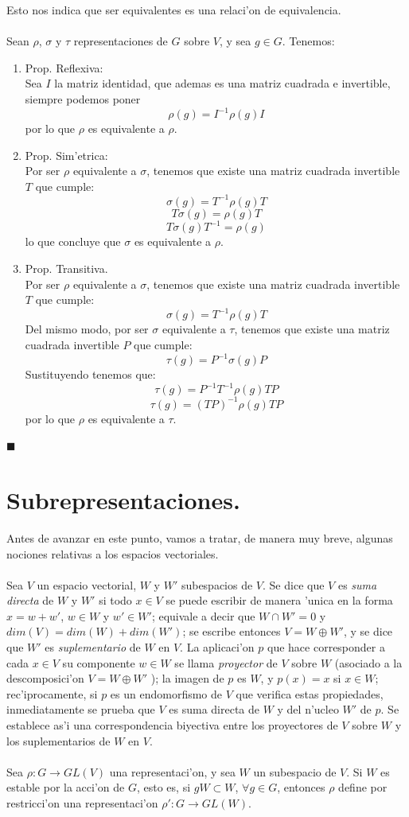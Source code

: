 \documentclass[a4paper,openright,12pt]{report}
\numberwithin{equation}{section} %
\newenvironment{proof}{\noindent{\it Demostracion:}}{\hfill$\blacksquare$} %
\begin{document}
Esto nos indica que ser equivalentes es una relaci'on de equivalencia.\\
\\
\begin{proof}
Sean $\rho$, $\sigma$ y $\tau$ representaciones de $G$ sobre $V$, y sea $g \in G$. Tenemos:
\begin{enumerate}
\item Prop. Reflexiva:\\
Sea $I$ la matriz identidad, que ademas es una matriz cuadrada e invertible, siempre podemos poner
\[
\rho (g) = I^{-1} \rho (g) I
\]
por lo que $\rho$ es equivalente a $\rho$.
\item Prop. Sim'etrica:\\
Por ser $\rho$ equivalente a $\sigma$, tenemos que existe una matriz cuadrada invertible $T$ que cumple:
\[
\sigma (g) = T^{-1}\rho (g) T
\]
\[
T \sigma (g) = \rho (g) T
\]
\[
T \sigma (g)T^{-1} = \rho (g) 
\]
lo que concluye que $\sigma$ es equivalente a $\rho$.
\item Prop. Transitiva.\\
Por ser $\rho$ equivalente a $\sigma$, tenemos que existe una matriz cuadrada invertible $T$ que cumple:
\[
\sigma (g) = T^{-1}\rho (g) T
\]
Del mismo modo, por ser $\sigma$ equivalente a $\tau$, tenemos que existe una matriz cuadrada invertible $P$ que cumple:
\[
\tau (g) = P^{-1}\sigma (g) P
\]
Sustituyendo tenemos que:
\[
\tau (g) = P^{-1}T^{-1} \rho (g)T P
\]
\[
\tau (g) = (TP)^{-1} \rho (g)T P
\]
por lo que $\rho$ es equivalente a $\tau$.
\end{enumerate}
\end{proof}
\section{Subrepresentaciones.}
Antes de avanzar en este punto, vamos a tratar, de manera muy breve, algunas nociones relativas a los espacios vectoriales.\\
\\
Sea $V$ un espacio vectorial, $W$ y $W'$ subespacios de $V$. Se dice que $V$ es \textit{suma directa} de $W$ y $W'$ si todo $x \in V$ se puede escribir de manera 'unica en la forma $x=w+w'$, $w \in W$ y $w' \in W'$; equivale a decir que $W \cap W'=0$ y $dim(V)=dim(W)+dim(W')$; se escribe entonces $V=W \oplus W'$, y se dice que $W'$ es \textit{suplementario} de $W$ en $V$. La aplicaci'on $p$ que hace corresponder a cada $x \in V$ su componente $w \in W$ se llama \textit{proyector} de $V$ sobre $W$ (asociado a la descomposici'on $V=W \oplus W'$ ); la imagen de $p$ es $W$, y $p(x)=x$ si $x \in W$; rec'iprocamente, si $p$ es un endomorfismo de $V$ que verifica estas propiedades, inmediatamente se prueba que $V$ es suma directa de $W$ y del n'ucleo $W'$ de $p$. Se establece as'i una correspondencia biyectiva entre los proyectores de $V$ sobre $W$ y los suplementarios de $W$ en $V$.\\
\\
Sea $\rho : G \rightarrow GL(V)$ una representaci'on, y sea $W$ un subespacio de $V$. Si $W$ es estable por la acci'on de $G$, esto es, si $gW \subset W$, $\forall g \in G$, entonces $\rho$ define por restricci'on una representaci'on $\rho' : G \rightarrow GL(W)$.
\end{document}
